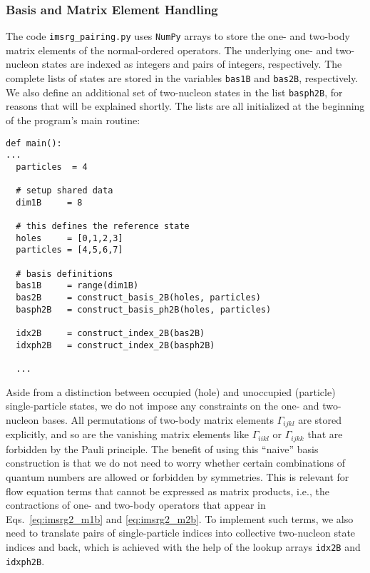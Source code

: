 {\subsubsection*{Basis and Matrix Element Handling}
The code \texttt{imsrg\_pairing.py} uses \texttt{NumPy} arrays to store
the one- and two-body matrix elements of the normal-ordered operators.
The underlying one- and two-nucleon states are indexed as integers and
pairs of integers, respectively. The complete lists of states are stored
in the variables \texttt{bas1B} and \texttt{bas2B}, respectively. We
also define an additional set of two-nucleon states in the list \texttt{basph2B},
for reasons that will be explained shortly. The lists are all initialized
at the beginning of the program's main routine:
\begin{lstlisting}
def main():
...
  particles  = 4

  # setup shared data
  dim1B     = 8

  # this defines the reference state
  holes     = [0,1,2,3]
  particles = [4,5,6,7]

  # basis definitions
  bas1B     = range(dim1B)
  bas2B     = construct_basis_2B(holes, particles)
  basph2B   = construct_basis_ph2B(holes, particles)

  idx2B     = construct_index_2B(bas2B)
  idxph2B   = construct_index_2B(basph2B)

  ...
\end{lstlisting}
Aside from a distinction between occupied (hole) and unoccupied (particle)
single-particle states, we do not impose any constraints on the one- and
two-nucleon bases. All permutations of two-body matrix elements $\Gamma_{ijkl}$
are stored explicitly, and so are the vanishing matrix elements like 
$\Gamma_{iikl}$ or $\Gamma_{ijkk}$ that are forbidden by the Pauli principle.
The benefit of using this ``naive'' basis construction is that we do not need
to worry whether certain combinations of quantum numbers are allowed or 
forbidden by symmetries. This is relevant for flow equation terms that cannot 
be expressed as matrix products, i.e., the contractions of one- and two-body 
operators that appear in Eqs.~\eqref{eq:imsrg2_m1b} and \eqref{eq:imsrg2_m2b}. 
To implement such terms, we also need to translate pairs of single-particle 
indices into collective two-nucleon state indices and back, which is achieved 
with the help of the lookup arrays \texttt{idx2B} and \texttt{idxph2B}.

}
